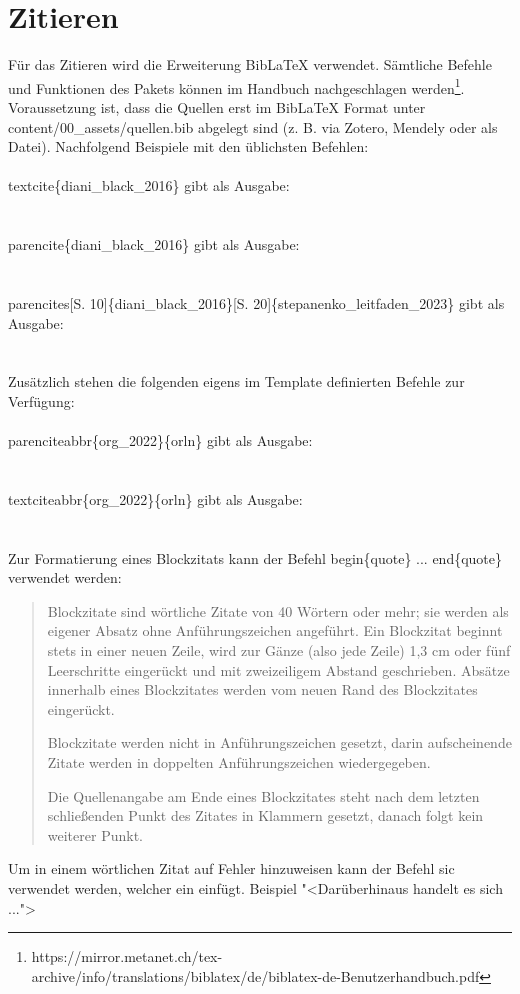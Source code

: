 \section{Zitieren}
Für das Zitieren wird die Erweiterung BibLaTeX verwendet. Sämtliche Befehle und Funktionen des Pakets können im Handbuch nachgeschlagen werden\footnote{https://mirror.metanet.ch/tex-archive/info/translations/biblatex/de/biblatex-de-Benutzerhandbuch.pdf}. Voraussetzung ist, dass die Quellen erst im BibLaTeX Format unter content/00\_assets/quellen.bib abgelegt sind (z. B. via Zotero, Mendely oder als Datei). Nachfolgend Beispiele mit den üblichsten Befehlen:\\
\\
\setminus textcite\{diani\_black\_2016\} gibt als Ausgabe:\\ 
\textcite{diani_black_2016}\\
\\
\setminus parencite\{diani\_black\_2016\} gibt als Ausgabe:\\ 
\parencite{diani_black_2016}\\
\\
\setminus parencites[S. 10]\{diani\_black\_2016\}[S. 20]\{stepanenko\_leitfaden\_2023\} gibt als Ausgabe:\\ 
\parencites[S. 10]{diani_black_2016}[S. 20]{stepanenko_leitfaden_2023}\\
\\
Zusätzlich stehen die folgenden eigens im Template definierten Befehle zur Verfügung:\\
\\
\setminus parenciteabbr\{org\_2022\}\{orln\} gibt als Ausgabe:\\ 
\\
\\
\setminus textciteabbr\{org\_2022\}\{orln\} gibt als Ausgabe:\\ 
\\
\\
Zur Formatierung eines Blockzitats kann der Befehl \setminus begin\{quote\} ... \setminus end\{quote\} verwendet werden:
\blockquote{Blockzitate sind wörtliche Zitate von 40 Wörtern oder mehr; sie werden als eigener Absatz ohne Anführungszeichen angeführt. Ein Blockzitat beginnt stets in einer neuen Zeile, wird zur Gänze (also jede Zeile) 1,3 cm oder fünf Leerschritte eingerückt und mit zweizeiligem Abstand geschrieben. Absätze innerhalb eines Blockzitates werden vom neuen Rand des Blockzitates eingerückt. \par Blockzitate werden nicht in Anführungszeichen gesetzt, darin aufscheinende Zitate werden in doppelten Anführungszeichen wiedergegeben. \par Die Quellenangabe am Ende eines Blockzitates steht nach dem letzten schließenden Punkt des Zitates in Klammern gesetzt, danach folgt kein weiterer Punkt.\\
\parencite[S. 111]{psychologie_richtlinien_2016}}
Um in einem wörtlichen Zitat auf Fehler hinzuweisen kann der Befehl \setminus sic verwendet werden, welcher ein \sic einfügt. Beispiel "<Darüberhinaus \sic handelt es sich ...">


